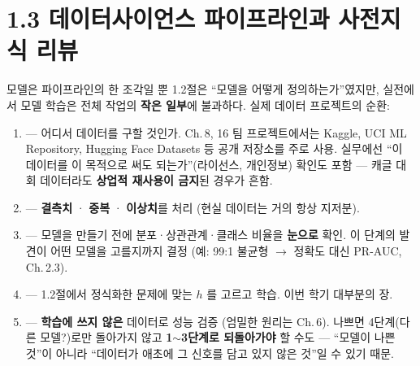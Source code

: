 \documentclass[aspectratio=169,11pt]{beamer}
\begin{document}

\section{1.3 데이터사이언스 파이프라인과 사전지식 리뷰}

\begin{frame}{모델은 파이프라인의 한 조각일 뿐}
  1.2절은 ``모델을 어떻게 정의하는가''였지만, 실전에서 모델 학습은
  전체 작업의 \textbf{작은 일부}에 불과하다. 실제 데이터 프로젝트의
  순환:
  \begin{enumerate}
    \item {} --- 어디서 데이터를 구할 것인가. Ch.\,8, 16 팀
      프로젝트에서는 Kaggle, UCI ML Repository, Hugging Face Datasets 등
      공개 저장소를 주로 사용. 실무에선 ``이 데이터를 이 목적으로 써도
      되는가''(라이선스, 개인정보) 확인도 포함 --- 캐글 대회 데이터라도
      \textbf{상업적 재사용이 금지}된 경우가 흔함.
    \item {} --- \textbf{결측치} · \textbf{중복} ·
      \textbf{이상치}를 처리 (현실 데이터는 거의 항상 지저분).
    \item {} --- 모델을 만들기 전에
      분포·상관관계·클래스 비율을 \textbf{눈으로} 확인. 이 단계의 발견이
      어떤 모델을 고를지까지 결정 (예: 99:1 불균형 $\to$
      정확도 대신 PR-AUC, Ch.\,2.3).
    \item {} --- 1.2절에서 정식화한 문제에 맞는 $h$ 를 고르고
      학습. 이번 학기 대부분의 장.
    \item {} --- \textbf{학습에 쓰지 않은} 데이터로 성능 검증
      (엄밀한 원리는 Ch.\,6). 나쁘면 4단계(다른 모델?)로만 돌아가지
      않고 \textbf{1$\sim$3단계로 되돌아가야} 할 수도 ---
      ``모델이 나쁜 것''이 아니라 ``데이터가 애초에 그 신호를 담고 있지
      않은 것''일 수 있기 때문.
  \end{enumerate}
\end{frame}
\end{document}
